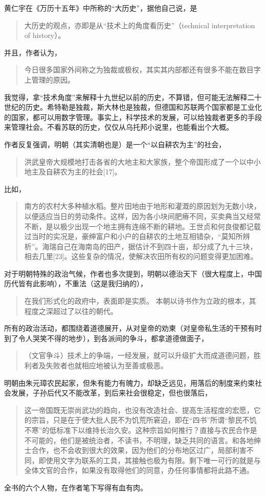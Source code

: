 黄仁宇在《万历十五年》中所称的“大历史”，据他自己说，是
\begin{quotation}
大历史的观点，亦即是从“技术上的角度看历史”（technical interpretation of history）。
\end{quotation}
并且，作者认为，
\begin{quotation}
今日很多国家外间称之为独裁或极权，其实其内部都还有很多不能在数目字上管理的原因。
\end{quotation}
我觉得，拿“技术角度”来解释十九世纪以前的历史，不算错，但可能无法解释二十世纪的历史。希特勒是独裁，斯大林也是独裁，但德国和苏联两个国家都是工业化的国家，都可以用数字管理。事实上，科学技术的发展，可以给独裁者更多的手段来管理社会。不看苏联的历史，仅仅从乌托邦小说里，也能看出个大概。

作者反复强调，明朝（其实清朝也是）是一个“以自耕农为主”的社会，
\begin{quotation}
洪武皇帝大规模地打击各省的大地主和大家族，整个帝国形成了一个以中小地主及自耕农为主的社会[17]。
\end{quotation}
比如，
\begin{quotation}
南方的农村大多种植水稻。整片田地由于地形和灌溉的原因划为无数小块，以便适应当日的劳动条件。这样，因为各小块间肥瘠不同，买卖典当又经常不断，是以极少出现一个地主拥有连绵不断的耕地。王世贞和何良俊都记载过当时的实况是，豪绅富户和小户的自耕农的土地互相错杂，“莫知所辨析”。海瑞自己在海南岛的田产，据估计不到四十亩，却分成了九十三块，相去几里[23]。这些复杂的情况，使解决农田所有权的问题变得更加困难。
\end{quotation}
对于明朝特殊的政治气候，作者也多次提到，明朝以德治天下（很大程度上，中国历代皆有此影响），不重法（这是我归纳的），
\begin{quotation}
在我们形式化的政府中，表面即是实质。 
本朝以诗书作为立政的根本，其程度之深超过了以往的朝代。
\end{quotation}
所有的政治活动，都围绕着道德展开，从对皇帝的劝柬（对皇帝私生活的干预有时到了令人哭笑不得的地步），到各派间的争斗，都拿道德做面子，
\begin{quotation}
（文官争斗）技术上的争端，一经发展，就可以升级扩大而成道德问题，胜利者及失败者也就相应地被认为至善或极恶。
\end{quotation}
明朝由朱元璋农民起家，但朱有能力有魄力，却缺乏远见，用落后的制度来约束社会发展，子孙后代又不能改革，到后来社会很稳定，但也很落后，
\begin{quotation}
这一帝国既无崇尚武功的趋向，也没有改造社会、提高生活程度的宏愿，它的宗旨，只是在于使大批人民不为饥荒所窘迫，即在“四书”所谓“黎民不饥不寒”的低标准下以维持长治久安。这种宗旨如何推行？直接与农民合作是不可能的，他们是被统治者，不读书，不明理，缺乏共同的语言。和各地绅士合作，也不会收到很大的效果，因为他们的分布地区过广，局部利害不同，即使用文字为联系的工具，其接触也极为有限。剩下唯一可行的就是与全体文官的合作，如果没有取得他们的同意，办任何事情都将此路不通。
\end{quotation}
全书的六个人物，在作者笔下写得有血有肉。

